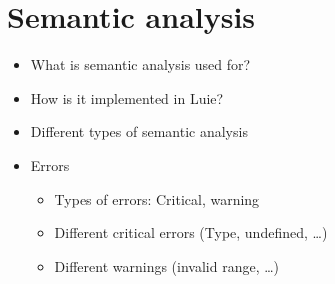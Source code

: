 \section{Semantic analysis}
\begin{itemize}
    \item What is semantic analysis used for?
    \item How is it implemented in Luie?
    \item Different types of semantic analysis
    \item Errors
    \begin{itemize}
        \item Types of errors: Critical, warning
        \item Different critical errors (Type, undefined, \dots)
        \item Different warnings (invalid range, \dots)
    \end{itemize}
\end{itemize}